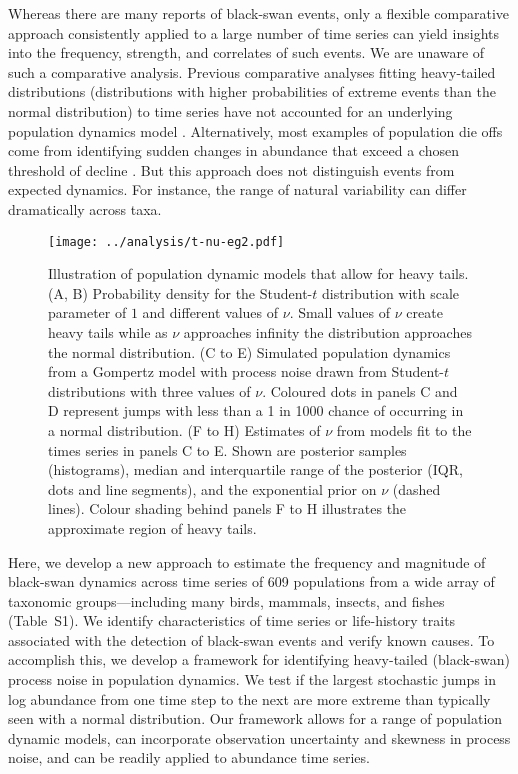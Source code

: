 \documentclass[9pt,twocolumn,twoside]{pnas-new}
\begin{document}
Whereas there are many reports of black-swan events,
only a flexible comparative approach consistently applied
to a large number of time series can yield insights into the frequency, strength,
and correlates of such events.
We are unaware of such a comparative analysis.
Previous comparative analyses fitting
heavy-tailed distributions
(distributions with higher probabilities of extreme events
than the normal distribution)
to time series
have not accounted for an underlying population dynamics model
\cite{keitt1998, allen2001, halley2002, segura2013}.
Alternatively, most examples of population die offs come from identifying
sudden changes in abundance that exceed a chosen threshold of decline
\cite{young1994, gerber2001, reed2003, fey2015}.
But this approach
does not distinguish events from
expected dynamics.
For instance, the range of natural variability
can differ dramatically across taxa.

\begin{figure*}[htb]
\centering
\texttt{[image: ../analysis/t-nu-eg2.pdf]}
\caption{ Illustration of population dynamic models that allow for heavy
tails. (A, B) Probability density for the Student-$t$
distribution with scale parameter of $1$ and different values of \(\nu\). Small
values of \(\nu\) create heavy tails while as \(\nu\) approaches infinity the
distribution approaches the normal distribution. (C to E)
Simulated population dynamics from a Gompertz model with process noise drawn
from Student-$t$ distributions with three values of \(\nu\). Coloured dots in
panels C and D represent jumps with less than a 1 in 1000
chance of occurring in a normal distribution. (F to H)
Estimates of \(\nu\) from models fit to the times series in panels C to
E. Shown are posterior samples (histograms), median and interquartile
range of the posterior (IQR, dots and line segments), and the exponential prior
on \(\nu\) (dashed lines). Colour shading behind panels F to H
illustrates the approximate region of heavy tails.}
\label{fig:1}
\end{figure*}



Here, we develop a new approach to estimate the frequency and magnitude of
black-swan dynamics across time series of 609 populations from a wide array of
taxonomic groups---including many  birds, mammals, insects, and fishes
(Table~S1). We identify characteristics of time series or
life-history traits associated with the detection of black-swan events and
verify known causes. To accomplish this, we develop a framework for identifying
heavy-tailed (black-swan) process noise in population dynamics.
We test if the largest stochastic jumps in log abundance from one time step to the next
are more extreme than typically seen with a normal distribution. Our framework
allows for a range of population dynamic models, can incorporate observation
uncertainty and skewness in process noise, and can be readily applied to
abundance time series.
\end{document}
